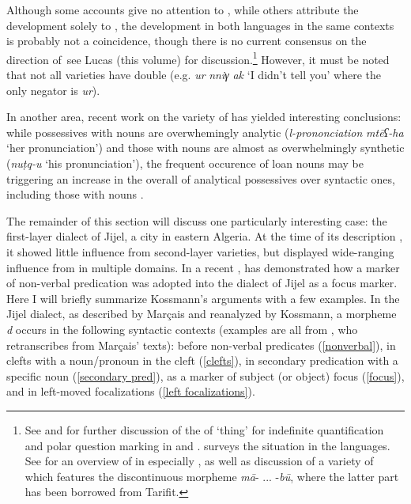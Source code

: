 \documentclass[output=paper]{langsci/langscibook}
\begin{document}
Although some accounts give no attention to , while others attribute the  development solely to , the development in both languages in the same contexts is probably not a coincidence, though there is no current consensus on the direction of  \textendash \,see Lucas (this volume) for discussion.\footnote{See \citet{Lucas2007,Lucas2010,Lucas2018} and \citet{Souag2018thing} for further discussion of the  of `thing’ for indefinite quantification and polar question marking in  and . \citet[324–334]{Kossmann2013book} surveys the situation in the  languages. See \citet{Lafkioui2013reinventing} for an overview of  in especially  , as well as discussion of a variety of   which features the discontinuous morpheme \textit{mā}{}- ... -\textit{bū}, where the latter part has been borrowed from Tarifit.} However, it must be noted that not all  varieties have double  (e.g.  \textit{ur} \textit{nniγ} \textit{ak} ‘I didn’t tell you’ where the only negator is \textit{ur}).

  In another area, recent work on the variety of  has yielded interesting conclusions: while possessives with  nouns are overwhemingly analytic (\textit{l-prononciation} \textit{mtēʕ-ha} ‘her pronunciation’) and those with  nouns are almost as overwhelmingly synthetic (\textit{nuṭq-u} ‘his pronunciation’), the frequent occurence of  loan nouns may be triggering an increase in the overall  of analytical possessives over syntactic ones, including those with  nouns \citep{Sayahi2015}.

  The remainder of this section will discuss one particularly interesting case: the first-layer dialect of Jijel, a city in eastern Algeria. At the time of its description \citep{Marçais1956}, it showed little influence from second-layer varieties, but displayed wide-ranging influence from  in multiple domains. In a recent , \citet{Kossmann2014} has demonstrated how a  marker of non-verbal predication was adopted into the  dialect of Jijel as a focus marker. Here I will briefly summarize Kossmann’s arguments with a few examples. In the Jijel dialect, as described by Marçais and reanalyzed by Kossmann, a morpheme \textit{d} occurs in the following syntactic contexts (examples  are all from \citealt[129]{Kossmann2014}, who retranscribes from Marçais’ texts): before non-verbal predicates (\ref{nonverbal}), in clefts with a noun/pronoun in the cleft (\ref{clefts}), in secondary predication with a specific noun (\ref{secondary pred}), as a marker of subject (or object) focus (\ref{focus}), and in left-moved focalizations (\ref{left focalizations}).
\end{document}
